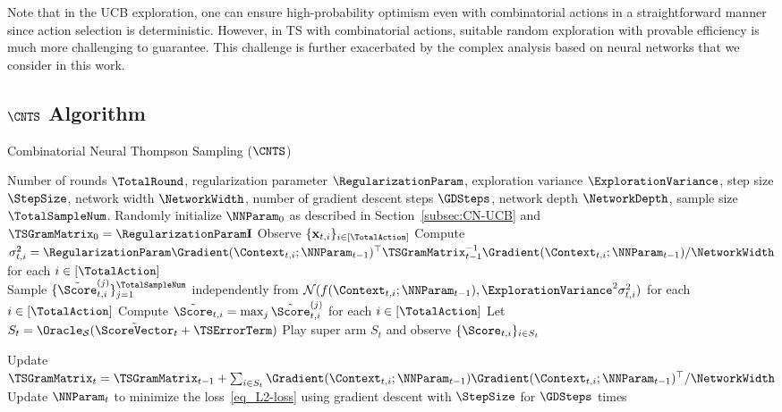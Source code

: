 \documentclass{article}
\theoremstyle{plain}
\begin{document}
Note that in the UCB exploration, one can ensure high-probability optimism even with combinatorial actions in a straightforward manner since action selection is deterministic. 
However, in TS with combinatorial actions, suitable random exploration with provable efficiency is much more challenging to guarantee.
This challenge is further exacerbated by the complex analysis based on neural networks that we consider in this work.


\subsection{$\CNTS$ Algorithm}
\begin{algorithm*}[t!]
  \caption{Combinatorial Neural Thompson Sampling ($\CNTS$)}
  \label{alg:CN-TS}
\begin{algorithmic}
     Number of rounds $\TotalRound$, regularization parameter $\RegularizationParam$, exploration variance $\ExplorationVariance$, step size $\StepSize$, network width $\NetworkWidth$, number of gradient descent steps $\GDSteps$, network depth $\NetworkDepth$, sample size $\TotalSampleNum$.
     Randomly initialize $\NNParam_0$  as described in Section~\ref{subsec:CN-UCB} and $\TSGramMatrix_0 = \RegularizationParam \mathbf{I}$
    \STATE Observe $\{ \mathbf{x}_{t,i} \}_{i \in [\TotalAction]}$
    \STATE Compute $\sigma_{t, i}^2 = \RegularizationParam \Gradient(\Context_{t,i}; \NNParam_{t-1})^\top \TSGramMatrix_{t-1}^{-1} \Gradient(\Context_{t,i}; \NNParam_{t-1}) 
    / \NetworkWidth$ for each $i \in [\TotalAction]$
    \\
    \STATE Sample $\{ \tilde{\Score}_{t,i}^{(j)} \}_{j=1}^{\TotalSampleNum}$ independently from $\mathcal{N}( f(\Context_{t,i}; \NNParam_{t-1}), \ExplorationVariance^2 \sigma_{t,i}^2)$ for each $i \in [\TotalAction]$
    \STATE Compute $\tilde{\Score}_{t, i} = \max_{j} \tilde{\Score}_{t,i}^{(j)}$ for each $i \in [\TotalAction]$
    \STATE Let $S_t = \Oracle_{\mathcal{S}} (\tilde{\ScoreVector}_t + \boldsymbol{\TSErrorTerm})$ 
    \STATE Play super arm $S_t$ and observe $\{ \Score_{t, i} \}_{i \in S_t}$
    
    \STATE Update $\TSGramMatrix_{t} = \TSGramMatrix_{t-1} + \sum_{i \in S_t} \Gradient(\Context_{t,i} ; \NNParam_{t-1}) \Gradient (\Context_{t,i}; \NNParam_{t-1})^\top /\NetworkWidth$
    \STATE Update $\NNParam_{t}$ to minimize the loss~\eqref{eq_L2-loss} using gradient descent with $\StepSize$ for $\GDSteps$ times
  \ENDFOR
\end{algorithmic}
\end{algorithm*}
\end{document}
